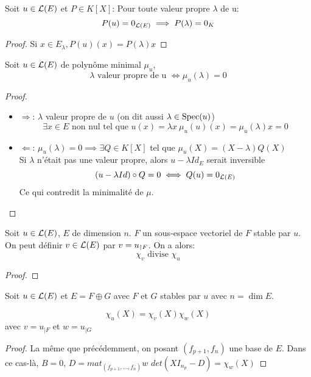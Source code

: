 \begin{prop}
	Soit $u \in \mathcal{L}(E)$ et $P \in K[X]$: Pour toute valeur propre $\lambda$ de u:
	$$ P(u) = 0_{\mathcal{L}(E)} \implies P(\lambda) = 0_K$$
\end{prop}

\begin{proof}
	Si $x \in E_\lambda , P(u)(x) = P(\lambda) x$ %
\end{proof}


\begin{prop}
	Soit $u \in \mathcal{L}(E)$ de polynôme minimal $\mu_u$,
	$$ \lambda \text{ valeur propre de u }\iff \mu_u(\lambda) = 0$$
\end{prop}


\begin{proof}
	\begin{itemize}
		\item  $\Rightarrow$:
		      $\lambda$ valeur propre de $u$ (on dit aussi $\lambda \in \text{Spec}(u)$)
		      $$\exists x \in E \text { non nul tel que } u(x) = \lambda x \ \mu_u(u)(x) = \mu_u(\lambda)x =0$$
		\item $\Leftarrow$:
		      $\mu_u(\lambda) = 0 \implies \exists Q \in K[X]$ tel que $\mu_u(X) = (X - \lambda)Q(X)$\\
		      Si $\lambda$ n'était pas une valeur propre, alors $u-\lambda Id_E$ serait inversible
		      $$ (u-  \lambda Id) \circ Q = 0 \iff Q(u) = 0_{\mathcal{L}(E)}$$
		      Ce qui contredit la minimalité de $\mu$.
	\end{itemize}
\end{proof}



\begin{prop}
	Soit $u \in \mathcal{L}(E)$, $E$ de dimension $n$.
	$F$ un sous-espace vectoriel de $F$ stable par $u$.
	On peut définir $v \in \mathcal{L}(E)$ par $v = u_{\restriction F}$. On a alors:
	$$\chi_v \text{ divise } \chi_u$$
\end{prop}

\begin{proof}
\end{proof}

\begin{prop}
	Soit $u \in \mathcal{L}(E)$ et $E = F \oplus G$ avec $F$ et $G$ stables par $u$ avec $n = \dim E$.

	$$\chi_u (X)= \chi_v (X) \chi_w(X)$$
	avec $v = u_{|F}$ et $w = u_{|G}$
\end{prop}

\begin{proof}
	La même que précédemment, on posant $(f_{p+1}, f_n)$ une base de $E$.
	Dans ce cas-là, $B = 0$, $D = mat_{(f_{p+1}, \dots, f_n)} w$
	$det(XI_{n_p} - D) = \chi_w(X)$
\end{proof}

